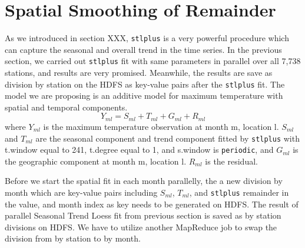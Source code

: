 \section{Spatial Smoothing of Remainder}
\label{sec:a1950.spafit}

As we introduced in section XXX, \texttt{stlplus} is a very powerful procedure
which can capture the seasonal and overall trend in the time series. In the 
previous section, we carried out \texttt{stlplus} fit with same parameters in
parallel over all 7,738 stations, and results are very promised. Meanwhile, the
results are save as division by station on the HDFS as key-value pairs after
the \texttt{stlplus} fit. The model we are proposing is an additive model for 
maximum temperature with spatial and temporal components. 
$$
Y_{ml} = S_{ml} + T_{ml} + G_{ml} + R_{ml}
$$
where $Y_{ml}$ is the maximum temperature observation at month m, location l. 
$S_{ml}$ and $T_{ml}$ are the seasonal component and trend component fitted by
\texttt{stlplus} with t.window equal to 241, t.degree equal to 1, and s.window
is \texttt{periodic}, and $G_{ml}$ is the geographic component at month m, 
location l. $R_{ml}$ is the residual. 

Before we start the spatial fit in each month parallelly, the a new division by
month which are key-value pairs including $S_{ml}$, $T_{ml}$, and \texttt{stlplus} 
remainder in the value, and month index as key needs to be generated on HDFS.
The result of parallel Seasonal Trend Loess fit from previous section is saved
as by station divisions on HDFS. We have to utilize another MapReduce job to 
swap the division from by station to by month.

